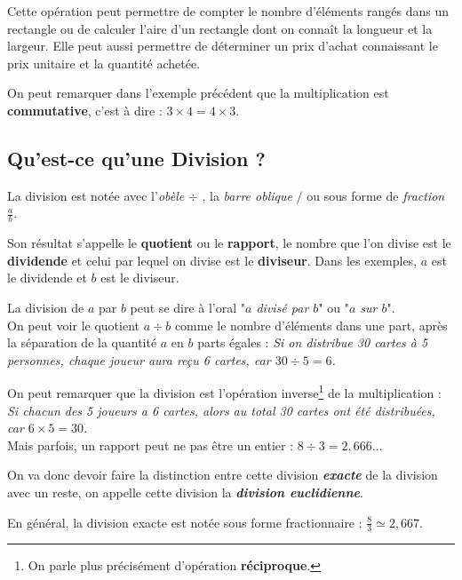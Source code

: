 \documentclass[a4paper]{article}
\begin{document}
	Cette opération peut permettre de compter le nombre d'éléments rangés dans un rectangle ou de calculer l'aire d'un rectangle dont on connaît la longueur et la largeur. Elle peut aussi permettre de déterminer un prix d'achat connaissant le prix unitaire et la quantité achetée.

On peut remarquer dans l'exemple précédent que la multiplication est \textbf{commutative}, c'est à dire : $3 \times 4 = 4 \times 3$.

\vspace{5 mm}

\subsection*{Qu'est-ce qu'une Division ?}

	La division est notée avec l'\textit{obèle} $\div$ , la \textit{barre oblique} $ / $ ou sous forme de \textit{fraction} {\Large $ \frac{a}{b} $}.
	
	Son résultat s'appelle le \textbf{quotient} ou le \textbf{rapport}, le nombre que l'on divise est le \textbf{dividende} et celui par lequel on divise est le \textbf{diviseur}. Dans les exemples, $a$ est le dividende et $b$ est le diviseur.

	La division de $a$ par $b$ peut se dire à l'oral "\textit{$a$ divisé par $b$}" ou "\textit{$a$ sur $b$}".\\


	On peut voir le quotient $a \div b$ comme le nombre d'éléments dans une part, après la séparation de la quantité $a$ en $b$ parts égales : 
	\textit{Si on distribue 30 cartes à 5 personnes, chaque joueur aura reçu 6 cartes, car $ 30 \div 5 = 6$. }
	
	On peut remarquer que la division est l'opération inverse\footnote{On parle plus précisément d'opération \textbf{réciproque}.} de la multiplication :
	\textit{Si chacun des 5 joueurs a 6 cartes, alors au total 30 cartes ont été distribuées, car $ 6 \times 5 = 30$. }\\
	
	Mais parfois, un rapport peut ne pas être un entier : $ 8 \div 3 = 2,666...$
	
	On va donc devoir faire la distinction entre cette division \textit{\textbf{exacte}} de la division avec un reste, on appelle cette division la \textbf{\textit{division euclidienne}}.
	
	En général, la division exacte est notée sous forme fractionnaire : $\frac{8}{3} \simeq 2,667$.
	
\end{document}
